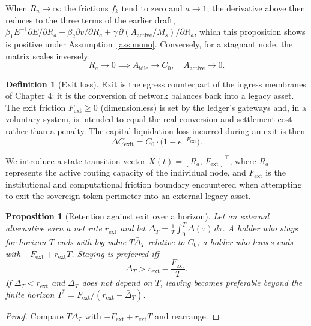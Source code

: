 \documentclass[11pt,a4paper]{article}
\theoremstyle{definition}
\newtheorem{definition}{Definition}
\theoremstyle{plain}
\newtheorem{proposition}{Proposition}
\theoremstyle{remark}
\begin{document}
When $R_a \to \infty$ the frictions $f_k$ tend to zero and $a \to 1$; the derivative above then reduces to the three terms of the earlier draft, $\beta_1 E^{-1}\partial E/\partial R_a + \beta_2 \partial v/\partial R_a + \gamma\,\partial(A_{\mathrm{active}}/M_s)/\partial R_a$, which this proposition shows is positive under Assumption~\ref{ass:mono}. Conversely, for a stagnant node, the matrix scales inversely:
\begin{equation}
R_a \to 0 \implies A_{\mathrm{idle}} \to C_0,\quad A_{\mathrm{active}} \to 0 .
\end{equation}

\begin{definition}[Exit loss]\label{def:exit}
Exit is the egress counterpart of the ingress membranes of Chapter 4: it is the conversion of network balances back into a legacy asset. The exit friction $F_{\mathrm{ext}} \ge 0$ (dimensionless) is set by the ledger's gateways and, in a voluntary system, is intended to equal the real conversion and settlement cost rather than a penalty. The capital liquidation loss incurred during an exit is then
\begin{equation}
\Delta C_{\mathrm{exit}} = C_0 \cdot \bigl( 1 - e^{-F_{\mathrm{ext}}} \bigr).
\end{equation}
\end{definition}

We introduce a state transition vector $X(t) = [R_a,\, F_{\mathrm{ext}}]^{\!\top}$, where $R_a$ represents the active routing capacity of the individual node, and $F_{\mathrm{ext}}$ is the institutional and computational friction boundary encountered when attempting to exit the sovereign token perimeter into an external legacy asset.

\begin{proposition}[Retention against exit over a horizon]\label{prop:exit}
Let an external alternative earn a net rate $r_{\mathrm{ext}}$ and let $\bar\Delta_T = \frac{1}{T}\int_0^T \Delta(\tau)\, d\tau$. A holder who stays for horizon $T$ ends with log value $T\bar\Delta_T$ relative to $C_0$; a holder who leaves ends with $-F_{\mathrm{ext}} + r_{\mathrm{ext}} T$. Staying is preferred iff
\begin{equation}
\bar\Delta_T > r_{\mathrm{ext}} - \frac{F_{\mathrm{ext}}}{T}.
\end{equation}
If $\bar\Delta_T < r_{\mathrm{ext}}$ and $\bar\Delta_T$ does not depend on $T$, leaving becomes preferable beyond the finite horizon $T^{*} = F_{\mathrm{ext}}/(r_{\mathrm{ext}} - \bar\Delta_T)$.
\end{proposition}
\begin{proof}
Compare $T\bar\Delta_T$ with $-F_{\mathrm{ext}} + r_{\mathrm{ext}} T$ and rearrange. \qedhere
\end{proof}
\end{document}
